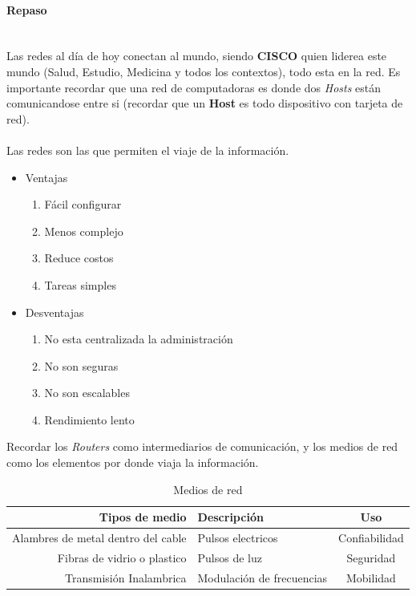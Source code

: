 \documentclass[a4paper]{report} %
\begin{document}
            \paragraph{Repaso}\mbox{} \\
              Las redes al día de hoy conectan al mundo, siendo \textbf{CISCO} quien liderea este mundo (Salud, Estudio, Medicina y todos los contextos), todo esta en la red.
              Es importante recordar que una red de computadoras es donde dos \textit{Hosts} están comunicandose entre si (recordar que un \textbf{Host} es todo dispositivo con tarjeta de red).
              \\\\Las redes son las que permiten el viaje de la información.
              \begin{itemize}
                \item Ventajas
                  \begin{enumerate}
                    \item Fácil configurar
                    \item Menos complejo
                    \item Reduce costos
                    \item Tareas simples
                  \end{enumerate}
                \item Desventajas
                  \begin{enumerate}
                    \item No esta centralizada la administración
                    \item No son seguras
                    \item No son escalables
                    \item Rendimiento lento
                  \end{enumerate}
              \end{itemize}
              Recordar los \textit{Routers} como intermediarios de comunicación, y los medios de red como los elementos por donde viaja la información.
              \begin{table}[t]
                \begin{center}
                  \begin{tabular}{| r | l | c |}
                    \centering
                      Tipos de medio & Descripción & Uso \\ \hline
                    Alambres de metal dentro del cable & Pulsos electricos & Confiabilidad \\
                      Fibras de vidrio o plastico & Pulsos de luz & Seguridad \\
                      Transmisión Inalambrica & Modulación de frecuencias & Mobilidad \\ \hline
                  \end{tabular}
                  \caption{Medios de red}
                  \label{tab:medios}
                \end{center}
              \end{table}
\end{document}
